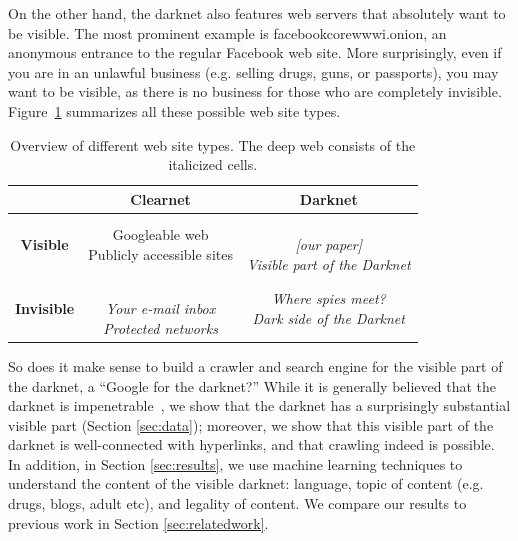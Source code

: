 \documentclass[USenglish,oneside,twocolumn]{article}
\begin{document}

On the other hand, the darknet also features web servers that absolutely want to be visible. The most prominent example is facebookcorewwwi.onion, an anonymous entrance to the regular Facebook web site. More surprisingly, even if you are in an unlawful business (e.g. selling drugs, guns, or passports), you may want to be visible, as there is no business for those who are completely invisible. Figure~\ref{tab:overview} summarizes all these possible web site types.


\begin{table}[h!]
  \begin{center}
    \caption{Overview of different web site types. The deep web consists of the italicized cells.}
    \label{tab:overview}
    \begin{tabular}{c|c | c }
      & \textbf{Clearnet} & \textbf{Darknet}\\
      \hline
      \textbf{Visible}&
      \shortstack[c]{Googleable web \\ Publicly accessible sites} & 
      \shortstack[c]{\\[1pt] \textit{[our paper]} \\ \textit{Visible part of the Darknet}}\\
      \hline
      \textbf{Invisible}&
      \shortstack[c]{\\[1pt] \textit{Your e-mail inbox} \\ \textit{Protected networks}} & 
      \shortstack[c]{\textit{Where spies meet?} \\ \textit{Dark side of the Darknet}}\\
    \end{tabular}
  \end{center}
\end{table}


So does it make sense to build a crawler and search engine for the visible part of the darknet, a ``Google for the darknet?'' While it is generally believed that the darknet is impenetrable~\cite{Biryukov2014,Nabki2017}, we show that the darknet has a surprisingly substantial visible part (Section \ref{sec:data}); moreover, we show that this visible part of the darknet is well-connected with hyperlinks, and that crawling indeed is possible. In addition, in Section \ref{sec:results}, we use machine learning techniques to understand the content of the visible darknet: language, topic of content (e.g. drugs, blogs, adult etc), and legality of content.  
We compare our results to previous work in Section \ref{sec:relatedwork}.
\end{document}
